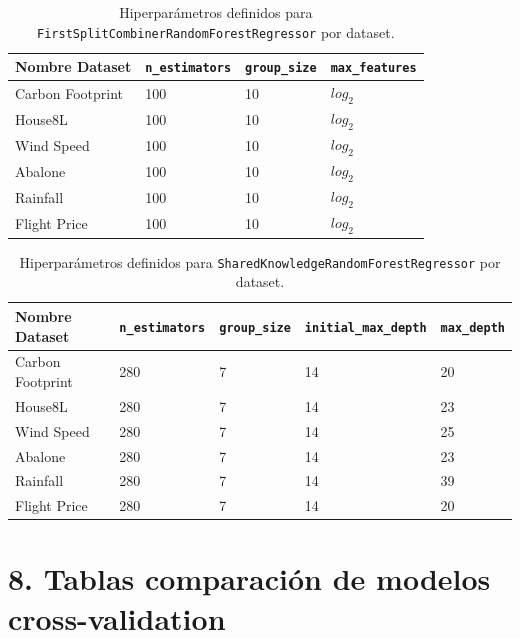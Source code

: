 \begin{table}[h]
\centering
    \caption{Hiperparámetros definidos para \texttt{FirstSplitCombinerRandomForestRegressor} por dataset.}
\begin{tabularx}{\textwidth}{l X X X}
\toprule
\textbf{Nombre Dataset} & \textbf{\texttt{n\_estimators}} & \textbf{\texttt{group\_size}} & \textbf{\texttt{max\_features}} \\
\midrule
Carbon Footprint & 100 & 10 & $log_2$ \\
House8L & 100 & 10 & $log_2$ \\
Wind Speed & 100 & 10 & $log_2$ \\
Abalone & 100 & 10 & $log_2$ \\
Rainfall & 100 & 10 & $log_2$ \\
Flight Price & 100 & 10 & $log_2$ \\
\bottomrule
\end{tabularx}
\end{table}

\begin{table}[h]
\centering
    \caption{Hiperparámetros definidos para \texttt{SharedKnowledgeRandomForestRegressor} por dataset.}
\begin{tabularx}{\textwidth}{l X X X X}
\toprule
\textbf{Nombre Dataset} & \textbf{\texttt{n\_estimators}} & \textbf{\texttt{group\_size}} & \textbf{\texttt{initial\_max\_depth}} &\textbf{\texttt{max\_depth}} \\
\midrule
Carbon Footprint & 280 & 7 & 14 & 20 \\
House8L & 280 & 7 & 14 & 23 \\
Wind Speed & 280 & 7 & 14 & 25 \\
Abalone & 280 & 7 & 14 & 23 \\
Rainfall & 280 & 7 & 14 & 39 \\
Flight Price & 280 & 7 & 14 & 20 \\
\bottomrule
\end{tabularx}
\end{table}

\FloatBarrier

\section*{8. Tablas comparación de modelos cross-validation}
\label{appendix8}

